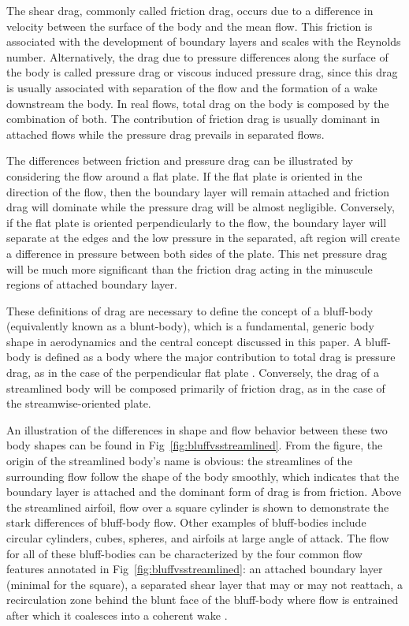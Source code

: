 \documentclass[journal]{new-aiaa}
\begin{document}
The shear drag, commonly called friction drag, occurs due to a difference in velocity between the surface of the body and the mean flow. This friction is associated with the development of boundary layers and scales with the Reynolds number. Alternatively, the drag due to pressure differences along the surface of the body is called pressure drag or viscous induced pressure drag, since this drag is usually associated with separation of the flow and the formation of a wake downstream the body. In real flows, total drag on the body is composed by the combination of both. The contribution of friction drag is usually dominant in attached flows while the pressure drag prevails in separated flows.

The differences between friction and pressure drag can be illustrated by considering the flow around a flat plate. If the flat plate is oriented in the direction of the flow, then the boundary layer will remain attached and friction drag will dominate while the pressure drag will be almost negligible. Conversely, if the flat plate is oriented perpendicularly to the flow, the boundary layer will separate at the edges and the low pressure in the separated, aft region will create a difference in pressure between both sides of the plate.  This net pressure drag will be much more significant than the friction drag acting in the minuscule regions of attached boundary layer.

These definitions of drag are necessary to define the concept of a bluff-body (equivalently known as a blunt-body), which is a fundamental, generic body shape in aerodynamics and the central concept discussed in this paper. A bluff-body is defined as a body where the major contribution to total drag is pressure drag, as in the case of the perpendicular flat plate \cite{anderson2010fundamentals}.  Conversely, the drag of a streamlined body will be composed primarily of friction drag, as in the case of the streamwise-oriented plate.

An illustration of the differences in shape and flow behavior between these two body shapes can be found in Fig~\ref{fig:bluffvsstreamlined}. From the figure, the origin of the streamlined body's name is obvious: the streamlines of the surrounding flow follow the shape of the body smoothly, which indicates that the boundary layer is attached and the dominant form of drag is from friction.  Above the streamlined airfoil, flow over a square cylinder is shown to demonstrate the stark differences of bluff-body flow. Other examples of bluff-bodies include circular cylinders, cubes, spheres, and airfoils at large angle of attack. The flow for all of these bluff-bodies can be characterized by the four common flow features annotated in Fig~\ref{fig:bluffvsstreamlined}: an attached boundary layer (minimal for the square), a separated shear layer that may or may not reattach, a recirculation zone behind the blunt face of the bluff-body where flow is entrained after which it coalesces into a coherent wake \cite{elkhoury2016assessment}.
\end{document}

